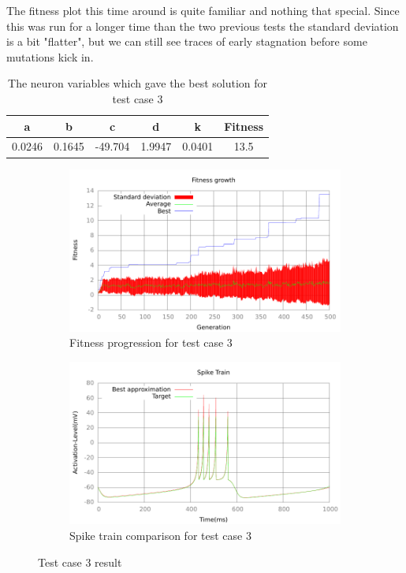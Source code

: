 The fitness plot this time around is quite familiar and nothing that special.
Since this was run for a longer time than the two previous tests the standard
deviation is a bit "flatter", but we can still see traces of early stagnation
before some mutations kick in.
\begin{table}
	\begin{tabular}{c c c c c c}
		a & b & c & d & k & Fitness\\
		\hline
		0.0246 & 0.1645 & -49.704 & 1.9947 & 0.0401 & 13.5
	\end{tabular}
	\caption{The neuron variables which gave the best solution for test case
	3}
\end{table}
\begin{figure}[h]
	\centering
	\begin{subfigure}[b]{0.5\textwidth}
		\includegraphics[width=\textwidth]{../output/wdm_izzy_1_fitness.pdf}
		\caption{Fitness progression for test case 3}
		\label{fig:fitness-test-case-3}
	\end{subfigure}%
	\begin{subfigure}[b]{0.5\textwidth}
		\includegraphics[width=\textwidth]{../output/wdm_izzy_1_spike.pdf}
		\caption{Spike train comparison for test case 3}
		\label{fig:spike-test-case-3}
	\end{subfigure}
	\caption{Test case 3 result}
\end{figure}

